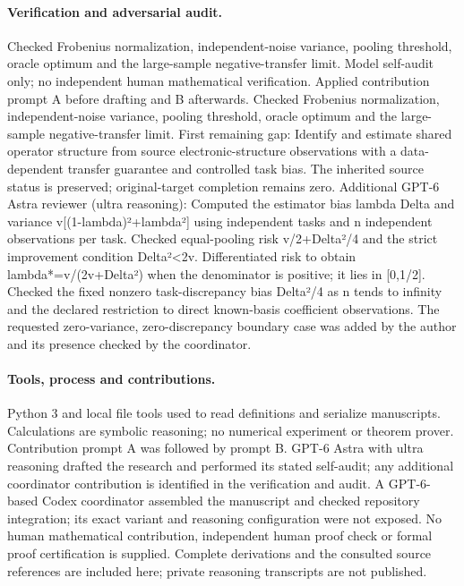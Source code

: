 \documentclass[11pt]{article}
\begin{document}
\paragraph{Verification and adversarial audit.}
Checked Frobenius normalization, independent-noise variance, pooling threshold, oracle optimum and the large-sample negative-transfer limit. Model self-audit only; no independent human mathematical verification. Applied contribution prompt A before drafting and B afterwards. Checked Frobenius normalization, independent-noise variance, pooling threshold, oracle optimum and the large-sample negative-transfer limit. First remaining gap: Identify and estimate shared operator structure from source electronic-structure observations with a data-dependent transfer guarantee and controlled task bias. The inherited source status is preserved; original-target completion remains zero. Additional GPT-6 Astra reviewer (ultra reasoning): Computed the estimator bias lambda Delta and variance v[(1-lambda)²+lambda²] using independent tasks and n independent observations per task. Checked equal-pooling risk v/2+Delta²/4 and the strict improvement condition Delta²<2v. Differentiated risk to obtain lambda*=v/(2v+Delta²) when the denominator is positive; it lies in [0,1/2]. Checked the fixed nonzero task-discrepancy bias Delta²/4 as n tends to infinity and the declared restriction to direct known-basis coefficient observations. The requested zero-variance, zero-discrepancy boundary case was added by the author and its presence checked by the coordinator.

\paragraph{Tools, process and contributions.}
Python 3 and local file tools used to read definitions and serialize manuscripts. Calculations are symbolic reasoning; no numerical experiment or theorem prover. Contribution prompt A was followed by prompt B. GPT-6 Astra with ultra reasoning drafted the research and performed its stated self-audit; any additional coordinator contribution is identified in the verification and audit. A GPT-6-based Codex coordinator assembled the manuscript and checked repository integration; its exact variant and reasoning configuration were not exposed. No human mathematical contribution, independent human proof check or formal proof certification is supplied. Complete derivations and the consulted source references are included here; private reasoning transcripts are not published.
\end{document}
